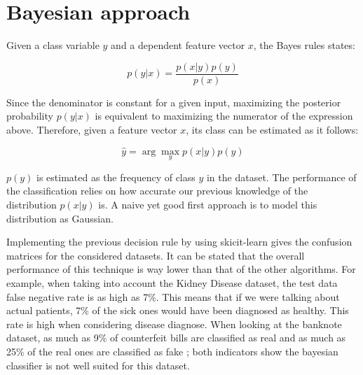 \documentclass[11pt,a4paper]{article}
\begin{document}
\section{Bayesian approach}
Given a class variable $y$ and a dependent feature vector $x$, the Bayes rules states:

$$p(y|x)=\frac{p(x|y)p(y)}{p(x)}$$

Since the denominator is constant for a given input, maximizing the posterior probability $p(y|x)$ is equivalent to maximizing the numerator of the expression above. Therefore, given a feature vector $x$, its class can be estimated as it follows: 

$$\hat{y}= \arg \max\limits_{y} p(x|y)p(y)$$

$p(y)$ is estimated as the frequency of class $y$ in the dataset. The performance of the classification relies on how accurate our previous knowledge of the distribution $p(x|y)$ is. A naive yet good first approach is to model this distribution as Gaussian. 

Implementing the previous decision rule by using skicit-learn gives the confusion matrices for the considered datasets. It can be stated that the overall performance of this technique is way lower than that of the other algorithms. For example, when taking into account the Kidney Disease dataset, the test data false negative rate is as high as 7\%. This means that if we were talking about actual patients, 7\% of the sick ones would have been diagnosed as healthy. This rate is high when considering disease diagnose. 
When looking at the banknote dataset, as much as 9\% of counterfeit bills are classified as real and as much as 25\% of the real ones are classified as fake ; both indicators show the bayesian classifier is not well suited for this dataset. 
\end{document}
